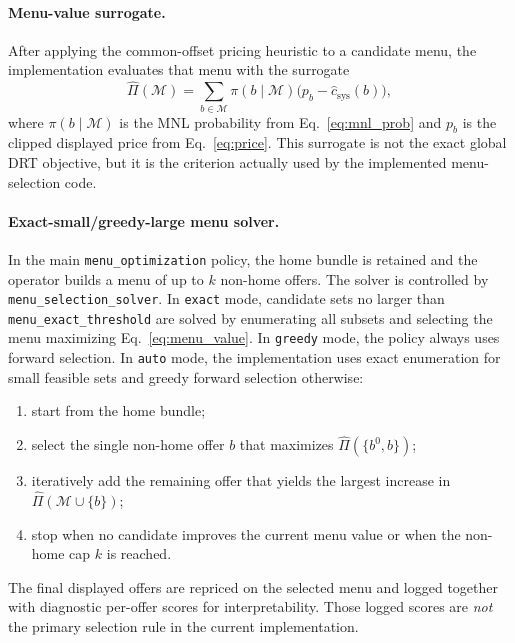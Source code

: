\paragraph{Menu-value surrogate.} After applying the common-offset pricing heuristic to a candidate menu, the implementation evaluates that menu with the surrogate
\begin{equation}
  \widehat{\Pi}(\mathcal{M}) = \sum_{b \in \mathcal{M}} \pi(b \mid \mathcal{M}) \bigl(p_b - \hat{c}_{\text{sys}}(b)\bigr),
  \label{eq:menu_value}
\end{equation}
where $\pi(b \mid \mathcal{M})$ is the MNL probability from Eq.~\ref{eq:mnl_prob} and $p_b$ is the clipped displayed price from Eq.~\ref{eq:price}. This surrogate is not the exact global DRT objective, but it is the criterion actually used by the implemented menu-selection code.

\paragraph{Exact-small/greedy-large menu solver.} In the main \texttt{menu\_optimization} policy, the home bundle is retained and the operator builds a menu of up to $k$ non-home offers. The solver is controlled by \texttt{menu\_selection\_solver}. In \texttt{exact} mode, candidate sets no larger than \texttt{menu\_exact\_threshold} are solved by enumerating all subsets and selecting the menu maximizing Eq.~\ref{eq:menu_value}. In \texttt{greedy} mode, the policy always uses forward selection. In \texttt{auto} mode, the implementation uses exact enumeration for small feasible sets and greedy forward selection otherwise:
\begin{enumerate}
  \item start from the home bundle;
  \item select the single non-home offer $b$ that maximizes $\widehat{\Pi}(\{b^0,b\})$;
  \item iteratively add the remaining offer that yields the largest increase in $\widehat{\Pi}(\mathcal{M}\cup\{b\})$;
  \item stop when no candidate improves the current menu value or when the non-home cap $k$ is reached.
\end{enumerate}
The final displayed offers are repriced on the selected menu and logged together with diagnostic per-offer scores for interpretability. Those logged scores are \emph{not} the primary selection rule in the current implementation.

